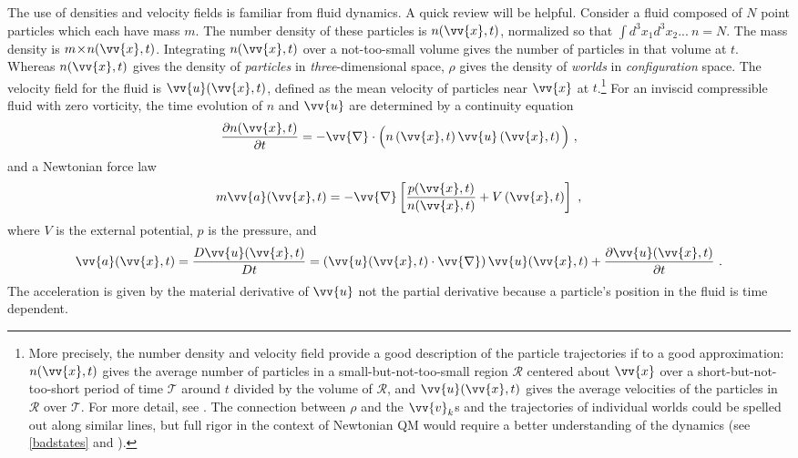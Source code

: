 \documentclass[onecolumn,secnumarabic,balancelastpage,amsmath,amssymb,nofootinbib]{article}
\begin{document}
The use of densities and velocity fields is familiar from fluid dynamics.  A quick review will be helpful.  Consider a fluid composed of $N$ point particles which each have mass $m$.  The number density of these particles is $n(\vv{x},t)$, normalized so that $\int \! d^3 x_1 d^3 x_2...\: n =N$.  The mass density is $m\!\times\! n(\vv{x},t)$.  Integrating $n(\vv{x},t)$ over a not-too-small volume gives the number of particles in that volume at $t$.  Whereas $n(\vv{x},t)$ gives the density of \emph{particles} in \emph{three}-dimensional space, $\rho$ gives the density of \emph{worlds} in \emph{configuration} space.  The velocity field for the fluid is $\vv{u}(\vv{x},t)$, defined as the mean velocity of particles near $\vv{x}$ at $t$.\footnote{More precisely, the number density and velocity field provide a good description of the particle trajectories if to a good approximation: $n(\vv{x},t)$ gives the average number of particles in a small-but-not-too-small region $\mathcal{R}$ centered about $\vv{x}$ over a short-but-not-too-short period of time $\mathcal{T}$ around $t$ divided by the volume of $\mathcal{R}$, and $\vv{u}(\vv{x},t)$ gives the average velocities of the particles in $\mathcal{R}$ over $\mathcal{T}$.  For more detail, see \citet[][]{chapman1970}.  The connection between $\rho$ and the $\vv{v}_k$s and the trajectories of individual worlds could be spelled out along similar lines, but full rigor in the context of Newtonian QM would require a better understanding of the dynamics (see \textsection \ref{badstates} and \citealp{HDW}).\label{morecareful}}  For an inviscid compressible fluid with zero vorticity, the time evolution of $n$ and $\vv{u}$ are determined by a continuity equation
\begin{equation}
\frac{\partial n(\vv{x},t)}{\partial t}=-\vv{\nabla} \cdot \Big(n\left(\vv{x},t\right)\vv{u}\left(\vv{x},t\right)\Big)\ ,
\label{fluidhamster}
\end{equation}
and a Newtonian force law
\begin{equation}
m \vv{a}(\vv{x},t)=-\vv{\nabla}\left[\frac{p(\vv{x},t)}{n(\vv{x},t)}+V\left(\vv{x},t\right)\right]\ ,
\label{fluideom}
\end{equation}
where $V$ is the external potential, $p$ is the pressure, and
\begin{equation}
\vv{a}(\vv{x},t)=\frac{D\vv{u}(\vv{x},t)}{Dt}=\left(\vv{u}(\vv{x},t)\cdot\vv{\nabla}\right)\vv{u}(\vv{x},t)+\frac{\partial \vv{u}(\vv{x},t)}{\partial t}\ .
\label{fluidaccel}
\end{equation}
The acceleration is given by the material derivative of $\vv{u}$ not the partial derivative because a particle's position in the fluid is time dependent.
\end{document}
